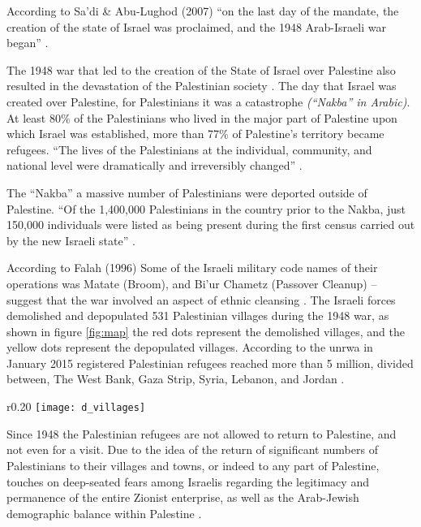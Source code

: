  According to Sa’di \& Abu-Lughod
(2007) “on the last day of the mandate, the creation of the state of Israel was proclaimed,
and the 1948 Arab-Israeli war began” \citep{Sadi2007}. 



The 1948 war that led to the creation of the State of Israel over Palestine also resulted in the devastation of the Palestinian society \citep{Sadi2007}. The day that Israel was created over Palestine, for Palestinians it was a catastrophe \textit{(“Nakba” in Arabic)}. At least 80\% of the Palestinians who lived in the major part of Palestine upon which Israel was established, more than 77\% of Palestine’s territory became refugees. “The lives of the Palestinians at the individual,
community, and national level were dramatically and irreversibly changed” \citep{Sadi2007}.

The “Nakba” a massive number of Palestinians were deported outside of Palestine. “Of the
1,400,000 Palestinians in the country prior to the Nakba, just 150,000 individuals were listed
as being present during the first census carried out by the new Israeli state” \citep{Sanbar2007}.



According to Falah (1996) Some of the Israeli military code names of their operations was
Matate (Broom), and Bi’ur Chametz (Passover Cleanup) – suggest that the war involved an
aspect of ethnic cleansing \citep{Falah1996, Pappe2006}. The Israeli forces demolished and depopulated 531
Palestinian villages during the 1948 war, as shown in figure \ref{fig:map} the red dots represent the demolished villages, and the yellow dots represent the depopulated villages. 
According to the \acrshort{unrwa} in January 2015 registered
Palestinian refugees reached more than 5 million, divided between, The West Bank, Gaza
Strip, Syria, Lebanon, and Jordan \citep{Khalidi2015, DajaniDaoudi2011}. 
\begin{wrapfigure}{r}{0.20\textwidth} %
    \centering
    \texttt{[image: d\_villages]}
    \caption{Demolished and depopulated villages - Palestine Open Maps, © 2018  Visualizing Palestine}
    \label{fig:map}
\end{wrapfigure} 
Since 1948 the Palestinian refugees are not allowed to return to Palestine, and not even for a visit. Due to the idea of the return of significant numbers of Palestinians to their villages and towns, or indeed to any part of Palestine, touches on deep-seated fears among Israelis regarding the legitimacy and permanence of the entire Zionist enterprise, as well as the Arab-Jewish demographic balance within Palestine \citep{Khalidi2016}.



